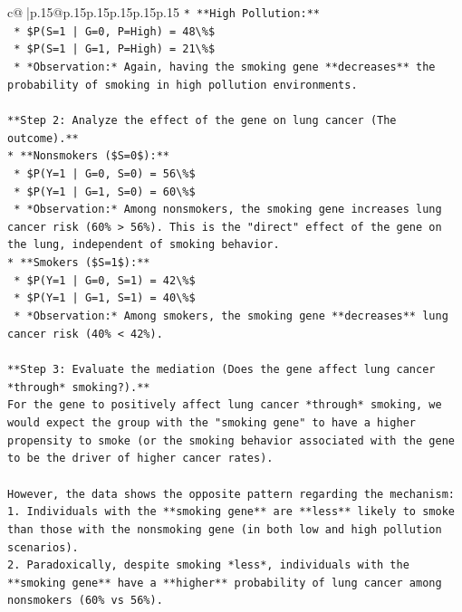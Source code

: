 \documentclass{article}
\begin{document}
{\begin{supertabular}{c@{$\;$}|p{.15\linewidth}@{}p{.15\linewidth}p{.15\linewidth}p{.15\linewidth}p{.15\linewidth}p{.15\linewidth}}
{{{\texttt{*   **High Pollution:**} \\
\texttt{    *   \$P(S=1 | G=0, P=High) = 48\textbackslash{}\%\$} \\
\texttt{    *   \$P(S=1 | G=1, P=High) = 21\textbackslash{}\%\$} \\
\texttt{    *   *Observation:* Again, having the smoking gene **decreases** the probability of smoking in high pollution environments.} \\
\\ 
\texttt{**Step 2: Analyze the effect of the gene on lung cancer (The outcome).**} \\
\texttt{*   **Nonsmokers (\$S=0\$):**} \\
\texttt{    *   \$P(Y=1 | G=0, S=0) = 56\textbackslash{}\%\$} \\
\texttt{    *   \$P(Y=1 | G=1, S=0) = 60\textbackslash{}\%\$} \\
\texttt{    *   *Observation:* Among nonsmokers, the smoking gene increases lung cancer risk (60\% > 56\%). This is the "direct" effect of the gene on the lung, independent of smoking behavior.} \\
\texttt{*   **Smokers (\$S=1\$):**} \\
\texttt{    *   \$P(Y=1 | G=0, S=1) = 42\textbackslash{}\%\$} \\
\texttt{    *   \$P(Y=1 | G=1, S=1) = 40\textbackslash{}\%\$} \\
\texttt{    *   *Observation:* Among smokers, the smoking gene **decreases** lung cancer risk (40\% < 42\%).} \\
\\ 
\texttt{**Step 3: Evaluate the mediation (Does the gene affect lung cancer *through* smoking?).**} \\
\texttt{For the gene to positively affect lung cancer *through* smoking, we would expect the group with the "smoking gene" to have a higher propensity to smoke (or the smoking behavior associated with the gene to be the driver of higher cancer rates).} \\
\\ 
\texttt{However, the data shows the opposite pattern regarding the mechanism:} \\
\texttt{1.  Individuals with the **smoking gene** are **less** likely to smoke than those with the nonsmoking gene (in both low and high pollution scenarios).} \\
\texttt{2.  Paradoxically, despite smoking *less*, individuals with the **smoking gene** have a **higher** probability of lung cancer among nonsmokers (60\% vs 56\%).} \\
}}}
\end{supertabular}}
\end{document}
